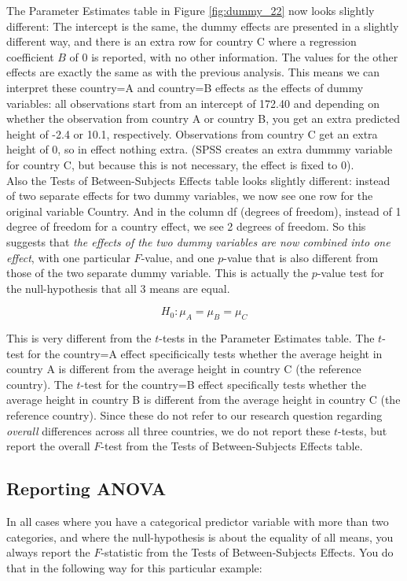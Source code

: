 \documentclass[]{report}\usepackage[]{graphicx}\usepackage[]{color}
\begin{document}
The Parameter Estimates table in Figure \ref{fig:dummy_22} now looks slightly different: The intercept is the same, the dummy effects are presented in a slightly different way, and there is an extra row for country C where a regression coefficient $B$ of 0 is reported, with no other information. The values for the other effects are exactly the same as with the previous analysis. This means we can interpret these country=A and country=B effects as the effects of dummy variables: all observations start from an intercept of 172.40 and depending on whether the observation from country A or country B, you get an extra predicted height of -2.4 or 10.1, respectively. Observations from country C get an extra height of 0, so in effect nothing extra. (SPSS creates an extra dummmy variable for country C, but because this is not necessary, the effect is fixed to 0).
\\
Also the Tests of Between-Subjects Effects table looks slightly different: instead of two separate effects for two dummy variables, we now see one row for the original variable Country. And in the column df (degrees of freedom), instead of 1 degree of freedom for a country effect, we see 2 degrees of freedom. So this suggests that \textit{the effects of the two dummy variables are now combined into one effect}, with one particular $F$-value, and one $p$-value that is also different from those of the two separate dummy variable. This is actually the $p$-value test for the null-hypothesis that all 3 means are equal. 

\begin{equation}
H_0: \mu_A= \mu_B=\mu_C
\end{equation}

This is very different from the $t$-tests in the Parameter Estimates table. The $t$-test for the country=A effect specificically tests whether the average height in country A is different from the average height in country C (the reference country). The $t$-test for the country=B effect specifically tests whether the average height in country B is different from the average height in country C (the reference country). Since these do not refer to our research question regarding \textit{overall} differences across all three countries, we do not report these $t$-tests, but report the overall $F$-test from the Tests of Between-Subjects Effects table.

\subsection{Reporting ANOVA}
In all cases where you have a categorical predictor variable with more than two categories, and where the null-hypothesis is about the equality of all means, you always report the $F$-statistic from the Tests of Between-Subjects Effects. You do that in the following way for this particular example:
\end{document}
